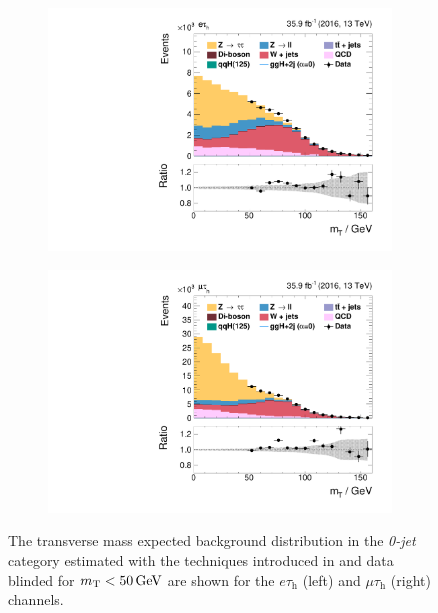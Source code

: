 \begin{figure}[h!]
    \centering
    \begin{subfigure}{0.45\textwidth}
        \centering
        \includegraphics[width=\textwidth]{Figures/eventselection/control_plots/et/ZeroJetCP/mt_1.pdf}%
    \end{subfigure}
    \begin{subfigure}{0.45\textwidth}
        \centering
        \includegraphics[width=\textwidth]{Figures/eventselection/control_plots/mt/ZeroJetCP/mt_1.pdf}%
    \end{subfigure}        
    \caption[\mt{} control plots in \textit{0-jet} category.]{The transverse mass expected background distribution in the
    \textit{0-jet} category estimated with the techniques introduced in  and data blinded for $m_\text{T}<\text{50\,{GeV}}$ are shown for the $e\tau_\text{h}$ (left) and $\mu\tau_\text{h}$ (right) channels.}\label{ES:dzeta}%
\end{figure}%


